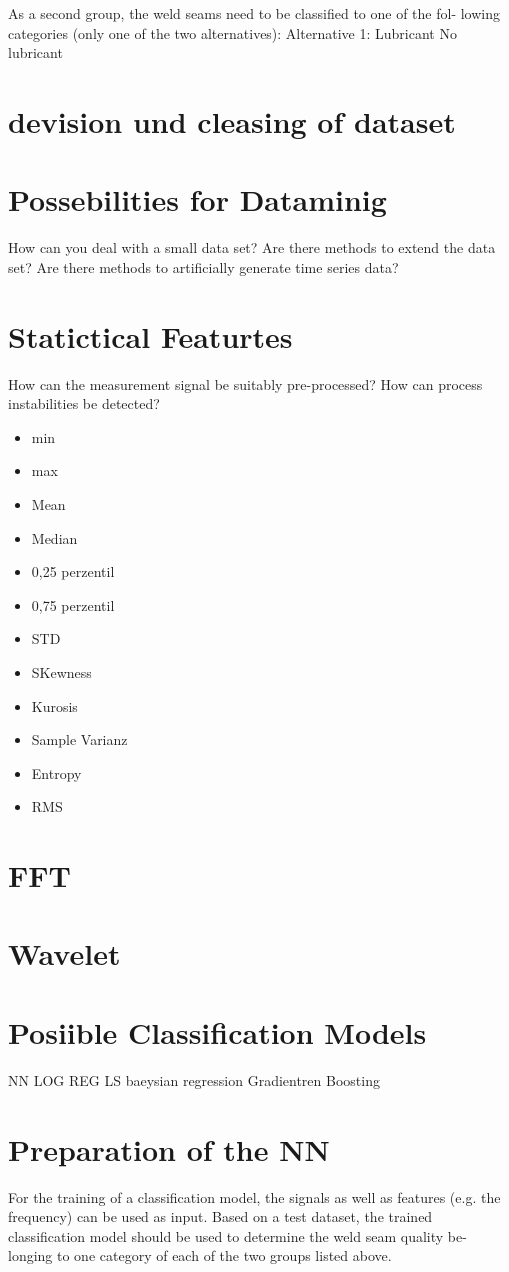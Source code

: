 \documentclass[12pt]{report}
\begin{document}
As a second group, the weld seams need to be classified to one of the fol-
lowing categories (only one of the two alternatives):
Alternative 1:
Lubricant
No lubricant



\section{devision und cleasing of dataset}
\section{Possebilities for Dataminig}
How can you deal with a small data set? Are there methods to extend the
data set? Are there methods to artificially generate time series data?
\section{Statictical Featurtes}
How can the measurement signal be suitably pre-processed?
How can process instabilities be detected?
\begin{itemize}
	\item min
	\item max
	\item Mean
	\item Median
	\item 0,25 perzentil
	\item 0,75 perzentil
	\item STD
	\item SKewness 
	\item Kurosis 
	\item Sample Varianz
	\item Entropy
	\item RMS
\end{itemize}
\section{FFT}
\section{Wavelet}
\section{Posiible Classification Models} 
NN
LOG REG
LS
baeysian regression
Gradientren Boosting

\section{Preparation of the NN}
For the training of a classification model, the signals as well as features (e.g.
the frequency) can be used as input. Based on a test dataset, the trained
classification model should be used to determine the weld seam quality be-
longing to one category of each of the two groups listed above.
\end{document}
